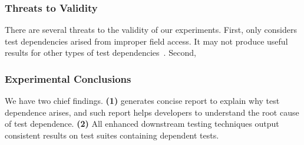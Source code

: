 \subsubsection{Threats to Validity}

There are several threats to the validity
of our experiments. First, \dtexplain 
only considers test dependencies arised
from improper field access. It may not
produce useful results for other types of
test dependencies~\cite{}. Second,

\subsubsection{Experimental Conclusions}

We have two chief findings. \textbf{(1)} \dtexplain
generates concise report to explain why
test dependence arises, and such report
helps developers to understand the root cause
of test dependence. \textbf{(2)} All
enhanced downstream testing techniques
output consistent results on test suites
containing dependent tests.
